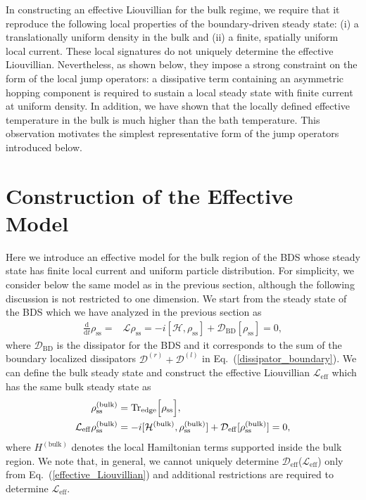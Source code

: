 \documentclass[a4paper, amsfonts, amssymb, amsmath, reprint, showkeys, nofootinbib, twoside,superscriptaddress, prb]{revtex4-2}
\newcommand{\m}[1]{\mathcal{#1}}
\newcommand{\mr}[1]{\mathrm{#1}}
\newcommand{\dt}{\frac{\mathrm{d}}{\mathrm{d}t}}
\begin{document}
In constructing an effective Liouvillian for the bulk regime, we require that it reproduce the following local properties of the boundary-driven steady state: (i) a translationally uniform density in the bulk and (ii) a finite, spatially uniform local current. These local signatures do not uniquely determine the effective Liouvillian. Nevertheless, as shown below, they impose a strong constraint on the form of the local jump operators: a dissipative term containing an asymmetric hopping component is required to sustain a local steady state with finite current at uniform density. In addition, we have shown that the locally defined effective temperature in the bulk is much higher than the bath temperature. This observation motivates the simplest representative form of the jump operators introduced below.


\section{Construction of the Effective Model \label{sec:model}}
Here we introduce an effective model for the bulk region of the BDS whose steady state has finite local current and uniform particle distribution. 
For simplicity, we consider below the same model as in the previous section, although the following discussion is not restricted to one dimension.
We start from the steady state of the BDS which we have analyzed in the previous section as
\begin{align}
\dt \rho_{\mr{ss}} =& \m{L}\rho_{\mr{ss}} = -i[\m{H},\rho_{\mr{ss}}] + \m{D}_{\mr{BD}}[\rho_{\mr{ss}}] = 0,
\end{align} 
where $\m{D}_{\mr{BD}}$ is the dissipator for the BDS and it corresponds to the sum of the boundary localized dissipators $\m{D}^{(r)} + \m{D}^{(l)}$ in Eq.~(\ref{dissipator_boundary}). We can define the bulk steady state and construct the effective Liouvillian $\m{L}_{\mr{eff}}$ which has the same bulk steady state as
\begin{align}
    \rho^{(\mr{bulk})}_{\mr{ss}} &= \mr{Tr_{edge}}\Bigl[ \rho_{\mr{ss}} \Bigr],\\
    \m{L}_{\mr{eff}} \rho^{(\mr{bulk})}_{\mr{ss}} &= -i[\m{H}^{(\mr{bulk})}, \rho^{(\mr{bulk})}_{\mr{ss}}] + \m{D}_\mr{eff}[\rho^{(\mr{bulk})}_{\mr{ss}}] = 0,\label{effective_Liouvillian}
\end{align}
where \(H^{(\mathrm{bulk})}\) denotes the local Hamiltonian terms supported inside the bulk region.
We note that, in general, we cannot uniquely determine $\m{D}_\mr{eff}$($\m{L}_{\mr{eff}}$) only from Eq.~(\ref{effective_Liouvillian}) and additional restrictions are required to determine $\m{L}_{\mr{eff}}$.
\end{document}
